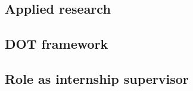 \subsection{Applied research}\label{chapter:research_applied}


\subsection{DOT framework}\label{chapter:research_framework}


\subsection{Role as internship supervisor}\label{chapter:research_supervisior}

